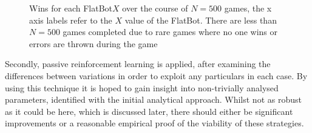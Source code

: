 \documentclass[10pt,conference,twocolumn]{IEEEtran}
\begin{document}
\begin{figure}[!t]
\centering
{}
\hfil
{}
\label{fig_sim}
\hfil
{}
\caption{Wins for each FlatBot$X$ over the course of $N=500$ games, the x axis labels refer to the $X$ value of the FlatBot. There are less than $N=500$ games completed due to rare games where no one wins or errors are thrown during the game}
\label{x}
\end{figure}

Secondly, passive reinforcement learning is applied, after examining the differences between variations in order to exploit any particulars in each case. By using this technique it is hoped to gain insight into non-trivially analysed parameters, identified with the initial analytical approach. Whilst not as robust as it could be here, which is discussed later, there should either be significant improvements or a reasonable empirical proof of the viability of these strategies.
\end{document}
